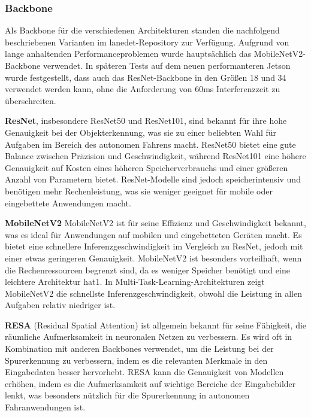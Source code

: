 \documentclass{article}
\begin{document}

            \subsubsection{Backbone}
                Als Backbone für die verschiedenen Architekturen standen die nachfolgend beschriebenen  Varianten im lanedet-Repository zur Verfügung. Aufgrund von lange anhaltenden Performanceproblemen wurde hauptsächlich das MobileNetV2-Backbone verwendet. In späteren Tests auf dem neuen performanteren Jetson wurde festgestellt, dass auch das ResNet-Backbone in den Größen 18 und 34 verwendet werden kann, ohne die Anforderung von 60ms Interferenzzeit zu überschreiten.

                \textbf{ResNet}, insbesondere ResNet50 und ResNet101, sind bekannt für ihre hohe Genauigkeit bei der Objekterkennung, was sie zu einer beliebten Wahl für Aufgaben im Bereich des autonomen Fahrens macht. ResNet50 bietet eine gute Balance zwischen Präzision und Geschwindigkeit, während ResNet101 eine höhere Genauigkeit auf Kosten eines höheren Speicherverbrauchs und einer größeren Anzahl von Parametern bietet. ResNet-Modelle sind jedoch speicherintensiv und benötigen mehr Rechenleistung, was sie weniger geeignet für mobile oder eingebettete Anwendungen macht.
                \cite{Chen2021Deep}

                \textbf{MobileNetV2}
                MobileNetV2 ist für seine Effizienz und Geschwindigkeit bekannt, was es ideal für Anwendungen auf mobilen und eingebetteten Geräten macht. Es bietet eine schnellere Inferenzgeschwindigkeit im Vergleich zu ResNet, jedoch mit einer etwas geringeren Genauigkeit. MobileNetV2 ist besonders vorteilhaft, wenn die Rechenressourcen begrenzt sind, da es weniger Speicher benötigt und eine leichtere Architektur hat1. In Multi-Task-Learning-Architekturen zeigt MobileNetV2 die schnellste Inferenzgeschwindigkeit, obwohl die Leistung in allen Aufgaben relativ niedriger ist.
                \cite{Chen2021Deep} \cite{Abdigapporov2022Performance}

                \textbf{RESA} (Residual Spatial Attention) ist allgemein bekannt für seine Fähigkeit, die räumliche Aufmerksamkeit in neuronalen Netzen zu verbessern. Es wird oft in Kombination mit anderen Backbones verwendet, um die Leistung bei der Spurerkennung zu verbessern, indem es die relevanten Merkmale in den Eingabedaten besser hervorhebt. RESA kann die Genauigkeit von Modellen erhöhen, indem es die Aufmerksamkeit auf wichtige Bereiche der Eingabebilder lenkt, was besonders nützlich für die Spurerkennung in autonomen Fahranwendungen ist.
\end{document}
